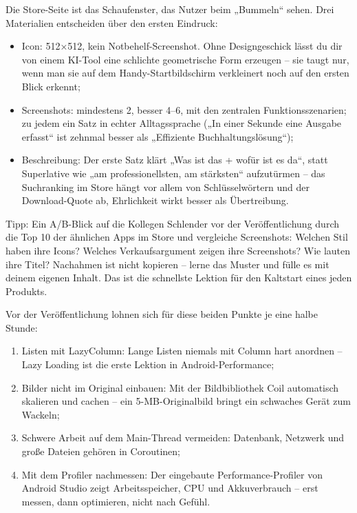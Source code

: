 
Die Store-Seite ist das Schaufenster, das Nutzer beim „Bummeln“ sehen. Drei Materialien entscheiden über den ersten Eindruck:

\begin{itemize}
  \item Icon: 512×512, kein Notbehelf-Screenshot. Ohne Designgeschick lässt du dir von einem KI-Tool eine schlichte geometrische Form erzeugen – sie taugt nur, wenn man sie auf dem Handy-Startbildschirm verkleinert noch auf den ersten Blick erkennt;
  \item Screenshots: mindestens 2, besser 4–6, mit den zentralen Funktionsszenarien; zu jedem ein Satz in echter Alltagssprache („In einer Sekunde eine Ausgabe erfasst“ ist zehnmal besser als „Effiziente Buchhaltungslösung“);
  \item Beschreibung: Der erste Satz klärt „Was ist das + wofür ist es da“, statt Superlative wie „am professionellsten, am stärksten“ aufzutürmen – das Suchranking im Store hängt vor allem von Schlüsselwörtern und der Download-Quote ab, Ehrlichkeit wirkt besser als Übertreibung.
\end{itemize}

\begin{tcbinfo}{Tipp: Ein A/B-Blick auf die Kollegen}
Schlender vor der Veröffentlichung durch die Top 10 der ähnlichen Apps im Store und vergleiche Screenshots: Welchen Stil haben ihre Icons? Welches Verkaufsargument zeigen ihre Screenshots? Wie lauten ihre Titel? Nachahmen ist nicht kopieren – lerne das Muster und fülle es mit deinem eigenen Inhalt. Das ist die schnellste Lektion für den Kaltstart eines jeden Produkts.

\end{tcbinfo}


Vor der Veröffentlichung lohnen sich für diese beiden Punkte je eine halbe Stunde:


\begin{enumerate}
  \item Listen mit LazyColumn: Lange Listen niemals mit Column hart anordnen – Lazy Loading ist die erste Lektion in Android-Performance;
  \item Bilder nicht im Original einbauen: Mit der Bildbibliothek Coil automatisch skalieren und cachen – ein 5-MB-Originalbild bringt ein schwaches Gerät zum Wackeln;
  \item Schwere Arbeit auf dem Main-Thread vermeiden: Datenbank, Netzwerk und große Dateien gehören in Coroutinen;
  \item Mit dem Profiler nachmessen: Der eingebaute Performance-Profiler von Android Studio zeigt Arbeitsspeicher, CPU und Akkuverbrauch – erst messen, dann optimieren, nicht nach Gefühl.
\end{enumerate}


